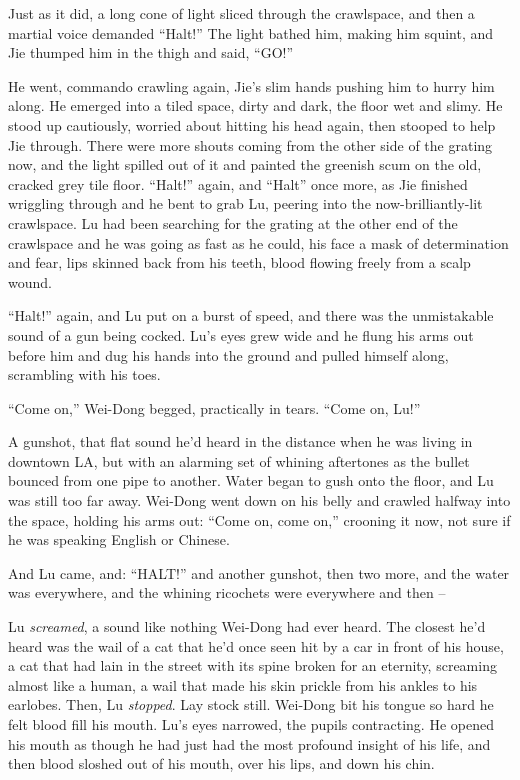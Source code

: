 Just as it did, a long cone of light sliced through the crawlspace,
and then a martial voice demanded ``Halt!'' The light bathed him,
making him squint, and Jie thumped him in the thigh and said,
``GO!''

He went, commando crawling again, Jie's slim hands pushing him to
hurry him along. He emerged into a tiled space, dirty and dark, the
floor wet and slimy. He stood up cautiously, worried about hitting
his head again, then stooped to help Jie through. There were more
shouts coming from the other side of the grating now, and the light
spilled out of it and painted the greenish scum on the old, cracked
grey tile floor. ``Halt!'' again, and ``Halt'' once more, as Jie
finished wriggling through and he bent to grab Lu, peering into the
now-brilliantly-lit crawlspace. Lu had been searching for the
grating at the other end of the crawlspace and he was going as fast
as he could, his face a mask of determination and fear, lips
skinned back from his teeth, blood flowing freely from a scalp
wound.

``Halt!'' again, and Lu put on a burst of speed, and there was the
unmistakable sound of a gun being cocked. Lu's eyes grew wide and
he flung his arms out before him and dug his hands into the ground
and pulled himself along, scrambling with his toes.

``Come on,'' Wei-Dong begged, practically in tears. ``Come on, Lu!''

A gunshot, that flat sound he'd heard in the distance when he was
living in downtown LA, but with an alarming set of whining
aftertones as the bullet bounced from one pipe to another. Water
began to gush onto the floor, and Lu was still too far away.
Wei-Dong went down on his belly and crawled halfway into the space,
holding his arms out: ``Come on, come on,'' crooning it now, not sure
if he was speaking English or Chinese.

And Lu came, and: ``HALT!'' and another gunshot, then two more, and
the water was everywhere, and the whining ricochets were everywhere
and then --

Lu \emph{screamed}, a sound like nothing Wei-Dong had ever heard.
The closest he'd heard was the wail of a cat that he'd once seen
hit by a car in front of his house, a cat that had lain in the
street with its spine broken for an eternity, screaming almost like
a human, a wail that made his skin prickle from his ankles to his
earlobes. Then, Lu \emph{stopped}. Lay stock still. Wei-Dong bit
his tongue so hard he felt blood fill his mouth. Lu's eyes
narrowed, the pupils contracting. He opened his mouth as though he
had just had the most profound insight of his life, and then blood
sloshed out of his mouth, over his lips, and down his chin.

